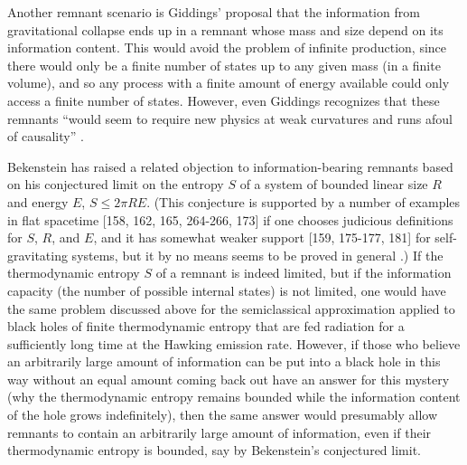 \documentclass[12pt]{article}
\begin{document}
     Another remnant scenario is Giddings' proposal \cite{Gid92} that
the
information from gravitational collapse ends up in a remnant whose
mass and
size depend on its information content.  This would avoid the problem
of
infinite production, since there would only be a finite number of
states up to
any given mass (in a finite volume), and so any process with a finite
amount of
energy available could only access a finite number of states.
However, even
Giddings recognizes that these remnants ``would seem to require new
physics at
weak curvatures and runs afoul of causality'' \cite{Gid93}.

     Bekenstein \cite{Bek93b} has raised a related objection to
information-bearing remnants based on his conjectured limit
\cite{Bek81}
on the entropy $S$ of a system of bounded linear size $R$ and energy
$E$,
$S\le 2\pi RE$.  (This conjecture is supported by a number of
examples in flat spacetime
[158, 162, 165, 264-266, 173]
if one chooses judicious definitions for $S$, $R$, and $E$, and
it has somewhat weaker support
[159, 175-177, 181]
for self-gravitating systems, but it by no means seems to be proved
in general \cite{UW82,Unw82,Pag82b,UW83}.)
If the thermodynamic entropy $S$ of a remnant is indeed limited,
but if the information capacity (the number of possible internal
states)
is not limited,
one would have the same problem \cite{Pag80b} discussed above
for the semiclassical approximation applied to black holes of finite
thermodynamic entropy that are fed radiation
for a sufficiently long time at the Hawking emission rate.
However, if those who believe an arbitrarily large amount of
information can be put into a black hole in this way without an
equal amount coming back out have an answer for this
mystery (why the thermodynamic entropy remains bounded
while the information content of the hole grows indefinitely),
then the same answer would presumably allow remnants to
contain an arbitrarily large amount of information, even if their
thermodynamic entropy is bounded, say by Bekenstein's
conjectured limit.
\end{document}
